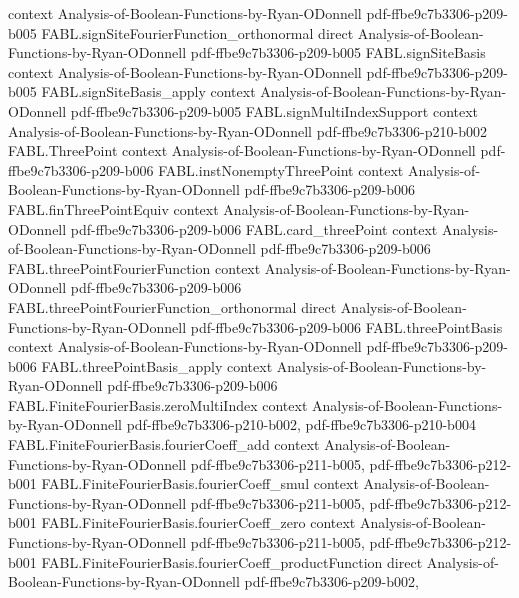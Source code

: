 \begin{theorem}
  {context}
  {Analysis-of-Boolean-Functions-by-Ryan-ODonnell}
  {pdf-ffbe9c7b3306-p209-b005}
\proofstep
  {FABL.signSiteFourierFunction_orthonormal}
  {direct}
  {Analysis-of-Boolean-Functions-by-Ryan-ODonnell}
  {pdf-ffbe9c7b3306-p209-b005}
\proofstep
  {FABL.signSiteBasis}
  {context}
  {Analysis-of-Boolean-Functions-by-Ryan-ODonnell}
  {pdf-ffbe9c7b3306-p209-b005}
\proofstep
  {FABL.signSiteBasis_apply}
  {context}
  {Analysis-of-Boolean-Functions-by-Ryan-ODonnell}
  {pdf-ffbe9c7b3306-p209-b005}
\proofstep
  {FABL.signMultiIndexSupport}
  {context}
  {Analysis-of-Boolean-Functions-by-Ryan-ODonnell}
  {pdf-ffbe9c7b3306-p210-b002}
\proofstep
  {FABL.ThreePoint}
  {context}
  {Analysis-of-Boolean-Functions-by-Ryan-ODonnell}
  {pdf-ffbe9c7b3306-p209-b006}
\proofstep
  {FABL.instNonemptyThreePoint}
  {context}
  {Analysis-of-Boolean-Functions-by-Ryan-ODonnell}
  {pdf-ffbe9c7b3306-p209-b006}
\proofstep
  {FABL.finThreePointEquiv}
  {context}
  {Analysis-of-Boolean-Functions-by-Ryan-ODonnell}
  {pdf-ffbe9c7b3306-p209-b006}
\proofstep
  {FABL.card_threePoint}
  {context}
  {Analysis-of-Boolean-Functions-by-Ryan-ODonnell}
  {pdf-ffbe9c7b3306-p209-b006}
\proofstep
  {FABL.threePointFourierFunction}
  {context}
  {Analysis-of-Boolean-Functions-by-Ryan-ODonnell}
  {pdf-ffbe9c7b3306-p209-b006}
\proofstep
  {FABL.threePointFourierFunction_orthonormal}
  {direct}
  {Analysis-of-Boolean-Functions-by-Ryan-ODonnell}
  {pdf-ffbe9c7b3306-p209-b006}
\proofstep
  {FABL.threePointBasis}
  {context}
  {Analysis-of-Boolean-Functions-by-Ryan-ODonnell}
  {pdf-ffbe9c7b3306-p209-b006}
\proofstep
  {FABL.threePointBasis_apply}
  {context}
  {Analysis-of-Boolean-Functions-by-Ryan-ODonnell}
  {pdf-ffbe9c7b3306-p209-b006}
\proofstep
  {FABL.FiniteFourierBasis.zeroMultiIndex}
  {context}
  {Analysis-of-Boolean-Functions-by-Ryan-ODonnell}
  {pdf-ffbe9c7b3306-p210-b002,
    pdf-ffbe9c7b3306-p210-b004}
\proofstep
  {FABL.FiniteFourierBasis.fourierCoeff_add}
  {context}
  {Analysis-of-Boolean-Functions-by-Ryan-ODonnell}
  {pdf-ffbe9c7b3306-p211-b005,
    pdf-ffbe9c7b3306-p212-b001}
\proofstep
  {FABL.FiniteFourierBasis.fourierCoeff_smul}
  {context}
  {Analysis-of-Boolean-Functions-by-Ryan-ODonnell}
  {pdf-ffbe9c7b3306-p211-b005,
    pdf-ffbe9c7b3306-p212-b001}
\proofstep
  {FABL.FiniteFourierBasis.fourierCoeff_zero}
  {context}
  {Analysis-of-Boolean-Functions-by-Ryan-ODonnell}
  {pdf-ffbe9c7b3306-p211-b005,
    pdf-ffbe9c7b3306-p212-b001}
\proofstep
  {FABL.FiniteFourierBasis.fourierCoeff_productFunction}
  {direct}
  {Analysis-of-Boolean-Functions-by-Ryan-ODonnell}
  {pdf-ffbe9c7b3306-p209-b002,
}
\end{theorem}
